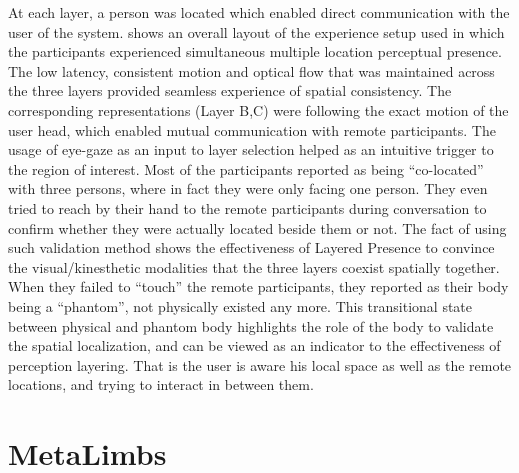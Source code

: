 At each layer, a person was located which enabled direct communication with the user of the system.  shows an overall layout of the experience setup used in which the participants experienced simultaneous multiple location perceptual presence. The low latency, consistent motion and optical flow that was maintained across the three layers provided seamless experience of spatial consistency. The corresponding representations (Layer B,C) were following the exact motion of the user head, which enabled mutual communication with remote participants. The usage of eye-gaze as an input to layer selection helped as an intuitive trigger to the region of interest. Most of the participants reported as being ``co-located'' with three persons, where in fact they were only facing one person. They even tried to reach by their hand to the remote participants during conversation to confirm whether they were actually located beside them or not. The fact of using such validation method shows the effectiveness of Layered Presence to convince the visual/kinesthetic modalities that the three layers coexist spatially together. When they failed to ``touch'' the remote participants, they reported as their body being a ``phantom'', not physically existed any more. This transitional state between physical and phantom body highlights the role of the body to validate the spatial localization, and can be viewed as an indicator to the effectiveness of perception layering. That is the user is aware his local space as well as the remote locations, and trying to interact in between them.





\pagebreak
\section{MetaLimbs}
\label{sec:eval-metalimbs}

